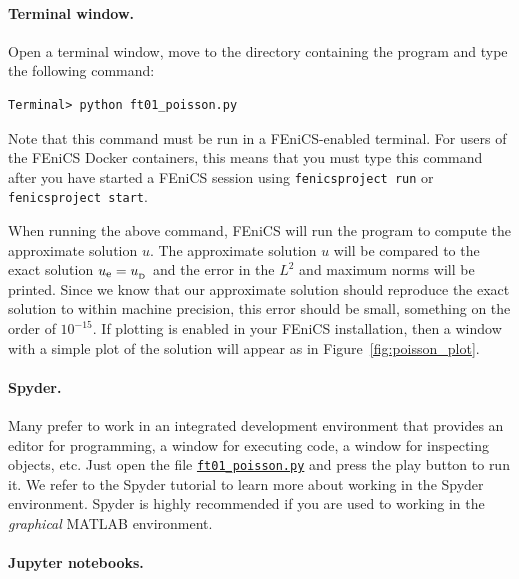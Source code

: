 \documentclass[graybox,envcountchap,sectrefs,final]{svmonodo}
\begin{document}
\noindent
\paragraph{Terminal window.}

Open a terminal
window, move to the directory containing the program and type the
following command:

\begin{Verbatim}[frame=lines,label=\fbox{{\tiny Terminal}},framesep=2.5mm,framerule=0.7pt,fontsize=\fontsize{9pt}{9pt}]
Terminal> python ft01_poisson.py
\end{Verbatim}
Note that this command must be run in a FEniCS-enabled terminal. For
users of the FEniCS Docker containers, this means that you must type
this command after you have started a FEniCS session using
\texttt{fenicsproject run} or \texttt{fenicsproject start}.

When running the above command, FEniCS will run the program to compute
the approximate solution $u$. The approximate solution $u$ will be
compared to the exact solution $\uex = \ub$ and the error in the $L^2$ and
maximum norms will be printed. Since we know that our approximate
solution should reproduce the exact solution to within machine
precision, this error should be small, something on the order of
$10^{-15}$. If plotting is enabled in your FEniCS installation,
then a window with a simple plot of the solution will appear as
in Figure~\ref{fig:poisson_plot}.

\paragraph{Spyder.}

Many prefer to work in an integrated development environment that
provides an editor for programming, a window for executing code, a
window for inspecting objects, etc. Just open the file
\href{{https://fenicsproject.org/pub/tutorial/python/vol1/ft01_poisson.py}}{\nolinkurl{ft01_poisson.py}}
and press the play button to run it. We refer to the Spyder tutorial
to learn more about working in the Spyder environment. Spyder is
highly recommended if you are used to working in the \emph{graphical}
MATLAB environment.

\paragraph{Jupyter notebooks.}
\end{document}
